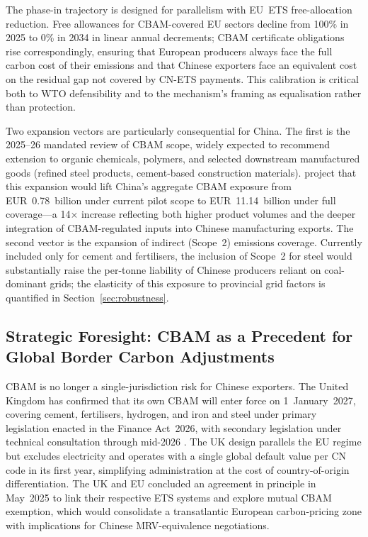 \documentclass[letterpaper, 10pt, conference]{ieeeconf}
\begin{document}
The phase-in trajectory is designed for parallelism with EU~ETS
free-allocation reduction. Free allowances for CBAM-covered EU sectors
decline from 100\% in 2025 to 0\% in 2034 in linear annual decrements;
CBAM certificate obligations rise correspondingly, ensuring that
European producers always face the full carbon cost of their emissions
and that Chinese exporters face an equivalent cost on the residual
gap not covered by CN-ETS payments. This calibration is critical both
to WTO defensibility and to the mechanism's framing as equalisation
rather than protection.

Two expansion vectors are particularly consequential for China. The
first is the 2025--26 mandated review of CBAM scope, widely expected
to recommend extension to organic chemicals, polymers, and selected
downstream manufactured goods (refined steel products,
cement-based construction materials).
\citet{Li2026} project that this expansion would lift China's
aggregate CBAM exposure from EUR~0.78~billion under current pilot
scope to EUR~11.14~billion under full coverage---a 14$\times$ increase
reflecting both higher product volumes and the deeper integration of
CBAM-regulated inputs into Chinese manufacturing exports. The second
vector is the expansion of indirect (Scope~2) emissions coverage.
Currently included only for cement and fertilisers, the inclusion of
Scope~2 for steel would substantially raise the
per-tonne liability of Chinese producers reliant on coal-dominant
grids; the elasticity of this exposure to provincial grid factors is
quantified in Section~\ref{sec:robustness}.

\subsection{Strategic Foresight: CBAM as a Precedent for Global Border Carbon Adjustments}
\label{sec:foresight}

CBAM is no longer a single-jurisdiction risk for Chinese exporters.
The United Kingdom has confirmed that its own CBAM will enter force on
1~January~2027, covering cement, fertilisers, hydrogen, and
iron and steel under primary legislation enacted in the Finance
Act~2026, with secondary legislation under technical consultation
through mid-2026 \citep{HMRC2026}. The UK design parallels the EU
regime but excludes electricity and operates with a single global
default value per CN code in its first year, simplifying
administration at the cost of country-of-origin differentiation. The
UK and EU concluded an agreement in principle in May~2025 to link
their respective ETS systems and explore mutual CBAM exemption,
which would consolidate a transatlantic European carbon-pricing zone
with implications for Chinese MRV-equivalence negotiations.
\end{document}
